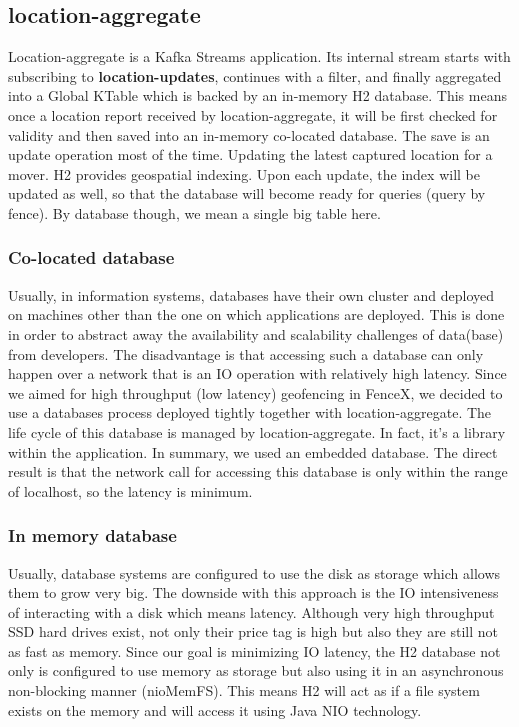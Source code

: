 \documentclass[a4]{report}
\begin{document}
    \subsection{location-aggregate}
    Location-aggregate is a Kafka Streams application.
    Its internal stream starts with subscribing to \textbf{location-updates}, continues with a filter, and finally aggregated into a Global KTable which is backed by an in-memory H2 database.
    This means once a location report received by location-aggregate, it will be first checked for validity and then
    saved into an in-memory co-located database.
    The save is an update operation most of the time.
    Updating the latest captured location for a mover.
    H2 provides geospatial indexing.
    Upon each update, the index will be updated as well, so that the database will become ready for queries (query by
    fence).
    By database though, we mean a single big table here.

    \subsubsection{Co-located database}
    Usually, in information systems, databases have their own cluster and deployed on machines other than the one on
    which applications are deployed.
    This is done in order to abstract away the availability and scalability challenges of data(base) from developers.
    The disadvantage is that accessing such a database can only happen over a network that is an IO operation with relatively high latency.
    Since we aimed for high throughput (low latency) geofencing in FenceX, we decided to use a databases process
    deployed tightly together with location-aggregate.
    The life cycle of this database is managed by location-aggregate.
    In fact, it's a library within the application.
    In summary, we used an embedded database.
    The direct result is that the network call for accessing this database is only within the range of localhost, so the
    latency is minimum.

    \subsubsection{In memory database}
    Usually, database systems are configured to use the disk as storage which allows them to grow very big.
    The downside with this approach is the IO intensiveness of interacting with a disk which means latency.
    Although very high throughput SSD hard drives exist, not only their price tag is high but also they are still not as fast as memory.
    Since our goal is minimizing IO latency, the H2 database not only is configured to use memory as storage but also
    using it in an asynchronous non-blocking manner (nioMemFS).
    This means H2 will act as if a file system exists on the memory and will access it using Java NIO \cite{JavaNio} technology.
\end{document}
